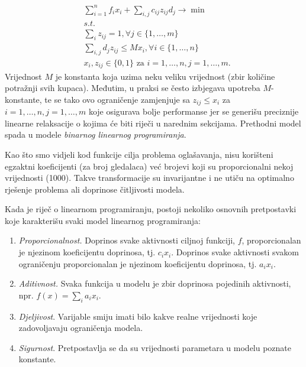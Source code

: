 \documentclass[a4paper, utf8, 11pt, colorlinks]{book}
\begin{document}
\begin{align*}
     &\sum_{i=1}^n f_i x_i  + \sum_{i,j} c_{ij} z_{ij} d_j \rightarrow \min\\
     & s.t. \nonumber \\
     & \sum_{i} z_{ij} = 1, \forall j\in\{1,\ldots,m\} \\
     & \sum_{i,j} d_j z_{ij} \leq M x_i, \forall i \in \{1,\ldots,n\} \\
     & x_i, z_{ij} \in \{0,1\} \mbox{ za } i = 1, \ldots, n, j = 1,  \ldots, m.
\end{align*}
Vrijednost $M$ je konstanta koja uzima neku veliku vrijednost (zbir količine potražnji svih kupaca). Međutim, u praksi se često izbjegava upotreba $M$-konstante, te se tako ovo ograničenje zamjenjuje sa $ z_{ij} \leq x_i$ 
za $ i = 1, \ldots, n, j = 1,  \ldots, m$ koje osigurava bolje performanse jer se generišu preciznije linearne relaksacije o kojima će biti riječi u narednim sekcijama. Prethodni model spada u modele \emph{binarnog linearnog programiranja}. 

Kao što smo vidjeli kod funkcije cilja problema oglašavanja,  
nisu korišteni egzaktni koeficijenti (za broj gledalaca) već brojevi koji su proporcionalni nekoj vrijednosti (1000). Takve transformacije su invarijantne i ne utiču na optimalno rješenje problema ali doprinose čitljivosti modela.
 
Kada je riječ o linearnom programiranju,  postoji nekoliko osnovnih pretpostavki koje karakterišu svaki model  linearnog programiranja:
\begin{enumerate}
    \item \emph{Proporcionalnost.} Doprinos svake aktivnosti ciljnoj funkciji, $f$, proporcionalan je njezinom koeficijentu doprinosa, tj. $c_ix_i$. Doprinos svake aktivnosti svakom   ograničenju proporcionalan je njezinom  koeficijentu doprinosa, tj. $a_ix_i$.
    \item  \emph{Aditivnost.} Svaka funkcija u modelu je zbir  doprinosa pojedinih aktivnosti, npr. $f(x) = \sum_i a_i x_i$.
    \item \emph{Djeljivost}. Varijable   smiju imati bilo kakve realne vrijednosti koje zadovoljavaju ograničenja modela.
    \item \emph{Sigurnost}. Pretpostavlja se da su vrijednosti parametara u modelu poznate konstante. 
\end{enumerate}
\end{document}

